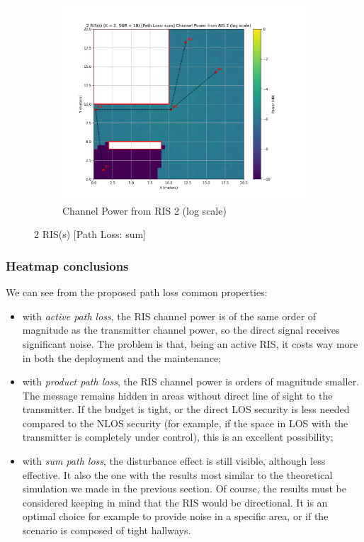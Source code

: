 \begin{figure}[H]
  \hfill
  \begin{subfigure}[b]{0.48\textwidth}
    \centering
    \includegraphics[width=\textwidth]{imgs/heatmap-simulations/2 RIS(s) (K = 2, SNR = 10) [Path Loss_ sum] Channel Power from RIS 2 (log scale).png}
    \caption{Channel Power from RIS 2 (log scale)}
  \end{subfigure}
  \caption{2 RIS(s) [Path Loss: sum]}
\end{figure}

\subsubsection{Heatmap conclusions}

We can see from the proposed path loss common properties:

\begin{itemize}
  \item with \textit{active path loss}, the RIS channel power is of the same order of magnitude as the transmitter channel power, so the direct signal receives significant noise. The problem is that, being an active RIS, it costs way more in both the deployment and the maintenance;
  \item with \textit{product path loss}, the RIS channel power is orders of magnitude smaller. The message remains hidden in areas without direct line of sight to the transmitter. If the budget is tight, or the direct LOS security is less needed compared to the NLOS security (for example, if the space in LOS with the transmitter is completely under control), this is an excellent possibility;
  \item with \textit{sum path loss}, the disturbance effect is still visible, although less effective. It also the one with the results most similar to the theoretical simulation we made in the previous section. Of course, the results must be considered keeping in mind that the RIS would be directional. It is an optimal choice for example to provide noise in a specific area, or if the scenario is composed of tight hallways.
\end{itemize}


